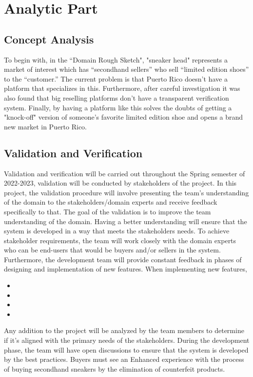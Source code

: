 \chapter{Analytic Part}
\newpage
\section{Concept Analysis}
\hspace{1cm} To begin with, in the “Domain Rough Sketch", 
"sneaker head" represents a market of interest which has “secondhand sellers” who sell “limited edition shoes” to the “customer.” 
The current problem is that Puerto Rico doesn't have a platform that specializes in this. Furthermore, after careful investigation it was also found that big reselling platforms don't have a transparent verification system. Finally, by having a platform like this solves the doubts of getting a "knock-off" version of someone's favorite limited edition shoe and opens a brand new market in Puerto Rico.
\section{Validation and Verification}
\hspace{1cm} Validation and verification will be carried out throughout the Spring semester of 2022-2023, validation will be conducted by stakeholders of the project. In this project, the validation procedure will involve presenting the team’s understanding of the domain to the stakeholders/domain experts and receive feedback specifically to that. The goal of the validation is to improve the team understanding of the domain. Having a better understanding will ensure that the system is developed in a way that meets the stakeholders needs. To achieve stakeholder requirements, the team will work closely with the domain experts who can be end-users that would be buyers and/or sellers in the system. Furthermore, the development team will provide constant feedback in phases of designing and implementation of new features. When implementing new features, 
\begin{itemize}
  \item {}
  \item {}
  \item {}
  \item {}
\end{itemize}
Any addition to the project will be analyzed by the team members to determine if it’s aligned with the primary needs of the stakeholders. During the development phase, the team will have open discussions to ensure that the system is developed by the best practices. Buyers must see an Enhanced experience with the process of buying secondhand sneakers by the elimination of counterfeit products.
